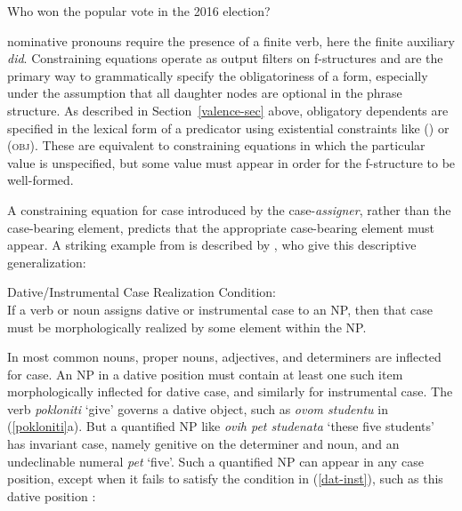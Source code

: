 \begin{exe}
\ex  Who won the popular vote in the 2016 election? 
\label{she}
\begin{xlist}
\end{xlist}
\end{exe}
 nominative pronouns require the presence of a finite verb, here the finite auxiliary \textit{did}.  Constraining equations operate as output filters on f-structures and are the primary way to grammatically specify the obligatoriness of a form, especially under the assumption that all daughter nodes are optional in the phrase structure.  As described in Section~\ref{valence-sec} above, obligatory dependents are specified in the lexical form of a predicator using existential constraints like (\up \subj) or (\up \textsc{obj}).  These are equivalent to constraining equations in which the particular value is unspecified, but some value must appear in order for the f-structure to be well-formed.  

A constraining equation for case  introduced by the case-\textit{assigner}, rather than the case-bearing element, predicts that the appropriate case-bearing element must appear.  A striking example from  is described by \citet[134]{WZ2003a}, who give this descriptive generalization:

\ea
{\label{dat-inst}
 Dative/Instrumental Case Realization Condition:\\
If a verb or noun assigns dative or instrumental case to an NP, then that case must be morphologically realized by some element within the NP.}
\z

\noindent
In  most common nouns, proper nouns, adjectives, and determiners are inflected for case.  An NP in a dative position must contain at least one such item morphologically inflected for dative case, and similarly for instrumental case.  The verb \textit{pokloniti} `give' governs a dative object, such as \textit{ovom  studentu} in (\ref{pokloniti}a).  But a quantified NP like \textit{ovih pet studenata} `these five students' has invariant case, namely genitive on the determiner and noun, and an undeclinable numeral \textit{pet} `five'.  Such a quantified NP can appear in any case position, except when it fails to satisfy the condition in (\ref{dat-inst}), such as this dative position \citep[125]{WZ2003a}:

\begin{exe} 
\ex	\label{pokloniti} 
\begin{xlist}
\end{xlist}
\end{exe}

